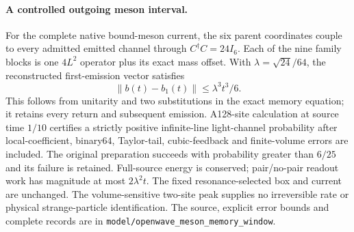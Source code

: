 \paragraph{A controlled outgoing meson interval.}
For the complete native bound-meson current, the six parent coordinates
couple to every admitted emitted channel through $C^\dagger C=24I_6$.
Each of the nine family blocks is one $4L^2$ operator plus its exact mass
offset.  With $\lambda=\sqrt{24}/64$, the reconstructed first-emission
vector satisfies
\[
 \|b(t)-b_1(t)\|\leq\lambda^3t^3/6.
\]
This follows from unitarity and two substitutions in the exact memory
equation; it retains every return and subsequent emission.  A128-site
calculation at source time $1/10$ certifies a strictly positive
infinite-line light-channel probability after local-coefficient,
binary64, Taylor-tail, cubic-feedback and finite-volume errors are
included.  The original preparation succeeds with probability greater
than $6/25$ and its failure is retained.  Full-source energy is conserved;
pair/no-pair readout work has magnitude at most $2\lambda^2t$.
The fixed resonance-selected box and current are unchanged.  The
volume-sensitive two-site peak supplies no irreversible rate or physical
strange-particle identification.  The source, explicit error bounds and
complete records are in
\texttt{model/openwave\_meson\_memory\_window}.

